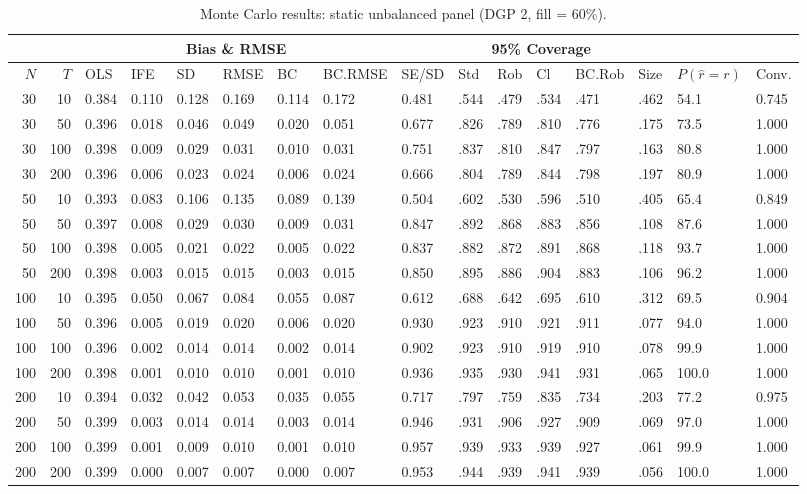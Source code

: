 \begin{table}[ht]
\centering
\caption{Monte Carlo results: static unbalanced panel (DGP 2, fill = 60\%).} 
\label{tab:mc_static_unb_f60}
\begin{tabular}{rrllllllllllllll}
  \hline
 & & \multicolumn{6}{c}{Bias \& RMSE} & & \multicolumn{4}{c}{95\% Coverage} & & & \\
\cline{3-8}\cline{10-13}
 \hline
$N$ & $T$ & OLS & IFE & SD & RMSE & BC & BC.RMSE & SE/SD & Std & Rob & Cl & BC.Rob & Size & $P(\hat r=r)$ & Conv. \\ 
  \hline
30 & 10 & 0.384 & 0.110 & 0.128 & 0.169 & 0.114 & 0.172 & 0.481 & .544 & .479 & .534 & .471 & .462 & 54.1 & 0.745 \\ 
  30 & 50 & 0.396 & 0.018 & 0.046 & 0.049 & 0.020 & 0.051 & 0.677 & .826 & .789 & .810 & .776 & .175 & 73.5 & 1.000 \\ 
  30 & 100 & 0.398 & 0.009 & 0.029 & 0.031 & 0.010 & 0.031 & 0.751 & .837 & .810 & .847 & .797 & .163 & 80.8 & 1.000 \\ 
  30 & 200 & 0.396 & 0.006 & 0.023 & 0.024 & 0.006 & 0.024 & 0.666 & .804 & .789 & .844 & .798 & .197 & 80.9 & 1.000 \\ 
  50 & 10 & 0.393 & 0.083 & 0.106 & 0.135 & 0.089 & 0.139 & 0.504 & .602 & .530 & .596 & .510 & .405 & 65.4 & 0.849 \\ 
  50 & 50 & 0.397 & 0.008 & 0.029 & 0.030 & 0.009 & 0.031 & 0.847 & .892 & .868 & .883 & .856 & .108 & 87.6 & 1.000 \\ 
  50 & 100 & 0.398 & 0.005 & 0.021 & 0.022 & 0.005 & 0.022 & 0.837 & .882 & .872 & .891 & .868 & .118 & 93.7 & 1.000 \\ 
  50 & 200 & 0.398 & 0.003 & 0.015 & 0.015 & 0.003 & 0.015 & 0.850 & .895 & .886 & .904 & .883 & .106 & 96.2 & 1.000 \\ 
  100 & 10 & 0.395 & 0.050 & 0.067 & 0.084 & 0.055 & 0.087 & 0.612 & .688 & .642 & .695 & .610 & .312 & 69.5 & 0.904 \\ 
  100 & 50 & 0.396 & 0.005 & 0.019 & 0.020 & 0.006 & 0.020 & 0.930 & .923 & .910 & .921 & .911 & .077 & 94.0 & 1.000 \\ 
  100 & 100 & 0.396 & 0.002 & 0.014 & 0.014 & 0.002 & 0.014 & 0.902 & .923 & .910 & .919 & .910 & .078 & 99.9 & 1.000 \\ 
  100 & 200 & 0.398 & 0.001 & 0.010 & 0.010 & 0.001 & 0.010 & 0.936 & .935 & .930 & .941 & .931 & .065 & 100.0 & 1.000 \\ 
  200 & 10 & 0.394 & 0.032 & 0.042 & 0.053 & 0.035 & 0.055 & 0.717 & .797 & .759 & .835 & .734 & .203 & 77.2 & 0.975 \\ 
  200 & 50 & 0.399 & 0.003 & 0.014 & 0.014 & 0.003 & 0.014 & 0.946 & .931 & .906 & .927 & .909 & .069 & 97.0 & 1.000 \\ 
  200 & 100 & 0.399 & 0.001 & 0.009 & 0.010 & 0.001 & 0.010 & 0.957 & .939 & .933 & .939 & .927 & .061 & 99.9 & 1.000 \\ 
  200 & 200 & 0.399 & 0.000 & 0.007 & 0.007 & 0.000 & 0.007 & 0.953 & .944 & .939 & .941 & .939 & .056 & 100.0 & 1.000 \\ 
   \hline
\end{tabular}
\end{table}
